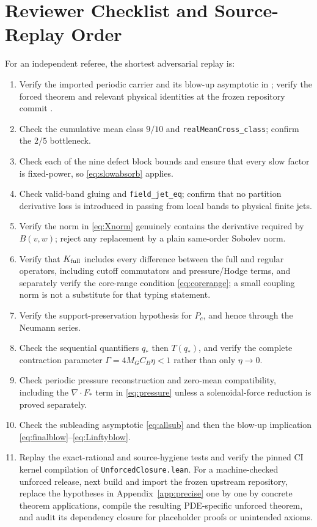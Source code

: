 \documentclass[11pt]{article}
\numberwithin{equation}{section}
\begin{document}
\section{Reviewer Checklist and Source-Replay Order}\label{app:review}

For an independent referee, the shortest adversarial replay is:
\begin{enumerate}[label=\textbf{R\arabic*.}]
\item Verify the imported periodic carrier and its blow-up asymptotic in \cite{OpenAI2026NS}; verify the forced theorem and relevant physical identities at the frozen repository commit \cite{OpenAIRepo2026}.
\item Check the cumulative mean class \(9/10\) and \texttt{realMeanCross\_class}; confirm the \(2/5\) bottleneck.
\item Check each of the nine defect block bounds and ensure that every slow factor is fixed-power, so \eqref{eq:slowabsorb} applies.
\item Check valid-band gluing and \texttt{field\_jet\_eq}; confirm that no partition derivative loss is introduced in passing from local bands to physical finite jets.
\item Verify the norm in \eqref{eq:Xnorm} genuinely contains the derivative required by \(B(v,w)\); reject any replacement by a plain same-order Sobolev norm.
\item Verify that \(K_{\rm full}\) includes every difference between the full and regular operators, including cutoff commutators and pressure/Hodge terms, and separately verify the core-range condition \eqref{eq:corerange}; a small coupling norm is not a substitute for that typing statement.
\item Verify the support-preservation hypothesis for \(P_c\), and hence through the Neumann series.
\item Check the sequential quantifiers \(q_*\) then \(T(q_*)\), and verify the complete contraction parameter \(\Gamma=4M_GC_B\eta<1\) rather than only \(\eta\to0\).
\item Check periodic pressure reconstruction and zero-mean compatibility, including the \(\nabla\!\cdot F_*\) term in \eqref{eq:pressure} unless a solenoidal-force reduction is proved separately.
\item Check the subleading asymptotic \eqref{eq:allsub} and then the blow-up implication \eqref{eq:finalblow}--\eqref{eq:Linftyblow}.
\item Replay the exact-rational and source-hygiene tests and verify the pinned CI kernel compilation of \texttt{UnforcedClosure.lean}.  For a machine-checked unforced release, next build and import the frozen upstream repository, replace the hypotheses in Appendix~\ref{app:precise} one by one by concrete theorem applications, compile the resulting PDE-specific unforced theorem, and audit its dependency closure for placeholder proofs or unintended axioms.
\end{enumerate}
\end{document}
